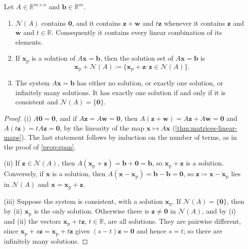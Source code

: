 \begin{theorem}
\label{thm:solution-structure}
Let $A\in\mathbb R^{m\times n}$ and $\mathbf b\in\mathbb R^m$.
\begin{enumerate}
\item $\mathcal N(A)$ contains $\mathbf 0$, and it contains $\mathbf z+\mathbf w$ and $t\mathbf z$ whenever it contains $\mathbf z$ and $\mathbf w$ and $t\in\mathbb R$. Consequently it contains every linear combination of its elements.
\item If $\mathbf x_{\mathrm p}$ is a solution of $A\mathbf x=\mathbf b$, then the solution set of $A\mathbf x=\mathbf b$ is
\[
\mathbf x_{\mathrm p}+\mathcal N(A)\coloneqq\{\mathbf x_{\mathrm p}+\mathbf z: \mathbf z\in\mathcal N(A)\}.
\]
\item The system $A\mathbf x=\mathbf b$ has either no solution, or exactly one solution, or infinitely many solutions. It has exactly one solution if and only if it is consistent and $\mathcal N(A)=\{\mathbf 0\}$.
\end{enumerate}
\end{theorem}

\begin{proof}
(i) $A\mathbf 0=\mathbf 0$, and if $A\mathbf z=A\mathbf w=\mathbf 0$, then $A(\mathbf z+\mathbf w)=A\mathbf z+A\mathbf w=\mathbf 0$ and $A(t\mathbf z)=tA\mathbf z=\mathbf 0$, by the linearity of the map $\mathbf x\mapsto A\mathbf x$ (\cref{thm:matrices-linear-maps}). The last statement follows by induction on the number of terms, as in the proof of \cref{prop:span}.

(ii) If $\mathbf z\in\mathcal N(A)$, then $A(\mathbf x_{\mathrm p}+\mathbf z)=\mathbf b+\mathbf 0=\mathbf b$, so $\mathbf x_{\mathrm p}+\mathbf z$ is a solution. Conversely, if $\mathbf x$ is a solution, then $A(\mathbf x-\mathbf x_{\mathrm p})=\mathbf b-\mathbf b=\mathbf 0$, so $\mathbf z\coloneqq\mathbf x-\mathbf x_{\mathrm p}$ lies in $\mathcal N(A)$ and $\mathbf x=\mathbf x_{\mathrm p}+\mathbf z$.

(iii) Suppose the system is consistent, with a solution $\mathbf x_{\mathrm p}$. If $\mathcal N(A)=\{\mathbf 0\}$, then by (ii) $\mathbf x_{\mathrm p}$ is the only solution. Otherwise there is $\mathbf z\ne\mathbf 0$ in $\mathcal N(A)$, and by (i) and (ii) the vectors $\mathbf x_{\mathrm p}+t\mathbf z$, $t\in\mathbb R$, are all solutions. They are pairwise different, since $\mathbf x_{\mathrm p}+s\mathbf z=\mathbf x_{\mathrm p}+t\mathbf z$ gives $(s-t)\mathbf z=\mathbf 0$ and hence $s=t$; so there are infinitely many solutions.
\end{proof}

